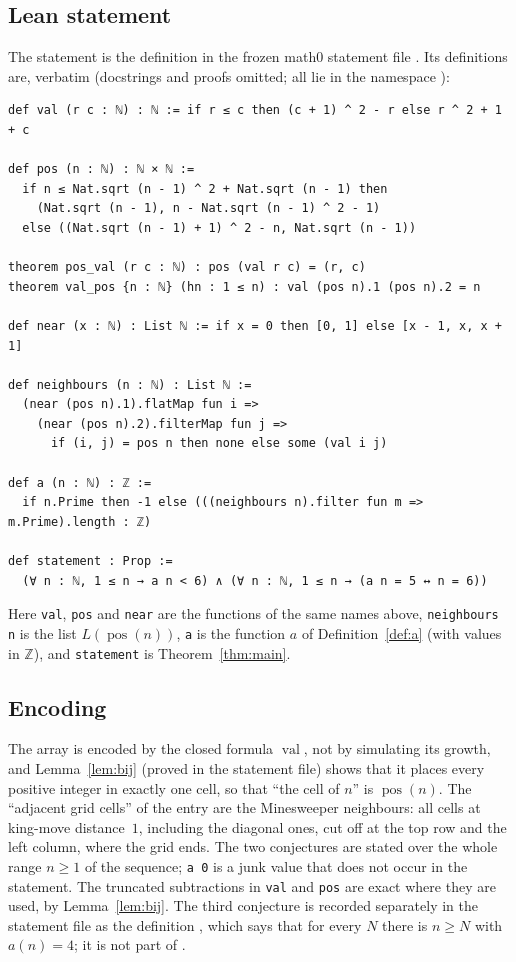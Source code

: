 \documentclass[11pt]{amsart}
\theoremstyle{plain}
\theoremstyle{definition}
\newcommand{\Z}{\mathbb{Z}}
\newcommand{\val}{\operatorname{val}}
\newcommand{\pos}{\operatorname{pos}}
\begin{document}
\subsection*{Lean statement}
The statement is the definition  in the frozen math0 statement file .
Its definitions are, verbatim (docstrings and proofs omitted; all lie in the namespace ):
\begin{lstlisting}
def val (r c : ℕ) : ℕ := if r ≤ c then (c + 1) ^ 2 - r else r ^ 2 + 1 + c

def pos (n : ℕ) : ℕ × ℕ :=
  if n ≤ Nat.sqrt (n - 1) ^ 2 + Nat.sqrt (n - 1) then
    (Nat.sqrt (n - 1), n - Nat.sqrt (n - 1) ^ 2 - 1)
  else ((Nat.sqrt (n - 1) + 1) ^ 2 - n, Nat.sqrt (n - 1))

theorem pos_val (r c : ℕ) : pos (val r c) = (r, c)
theorem val_pos {n : ℕ} (hn : 1 ≤ n) : val (pos n).1 (pos n).2 = n

def near (x : ℕ) : List ℕ := if x = 0 then [0, 1] else [x - 1, x, x + 1]

def neighbours (n : ℕ) : List ℕ :=
  (near (pos n).1).flatMap fun i =>
    (near (pos n).2).filterMap fun j =>
      if (i, j) = pos n then none else some (val i j)

def a (n : ℕ) : ℤ :=
  if n.Prime then -1 else (((neighbours n).filter fun m => m.Prime).length : ℤ)

def statement : Prop :=
  (∀ n : ℕ, 1 ≤ n → a n < 6) ∧ (∀ n : ℕ, 1 ≤ n → (a n = 5 ↔ n = 6))
\end{lstlisting}
Here \texttt{val}, \texttt{pos} and \texttt{near} are the functions of the same names above, \texttt{neighbours n} is the list $L(\pos(n))$, \texttt{a} is the function $a$ of Definition~\ref{def:a} (with values in $\Z$), and \texttt{statement} is Theorem~\ref{thm:main}.

\subsection*{Encoding}
The array is encoded by the closed formula $\val$, not by simulating its growth, and Lemma~\ref{lem:bij} (proved in the statement file) shows that it places every positive integer in exactly one cell, so that ``the cell of $n$'' is $\pos(n)$.
The ``adjacent grid cells'' of the entry are the Minesweeper neighbours: all cells at king-move distance~$1$, including the diagonal ones, cut off at the top row and the left column, where the grid ends.
The two conjectures are stated over the whole range $n\ge1$ of the sequence; \texttt{a 0} is a junk value that does not occur in the statement.
The truncated subtractions in \texttt{val} and \texttt{pos} are exact where they are used, by Lemma~\ref{lem:bij}.
The third conjecture is recorded separately in the statement file as the definition , which says that for every $N$ there is $n\ge N$ with $a(n)=4$; it is not part of .
\end{document}

